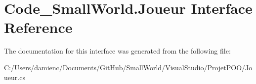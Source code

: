 \hypertarget{interface_code___small_world_1_1_joueur}{\section{Code\-\_\-\-Small\-World.\-Joueur Interface Reference}
\label{interface_code___small_world_1_1_joueur}
}


The documentation for this interface was generated from the following file\-:\begin{DoxyCompactItemize}
\item 
C\-:/\-Users/damienc/\-Documents/\-Git\-Hub/\-Small\-World/\-Visual\-Studio/\-Projet\-P\-O\-O/Joueur.\-cs\end{DoxyCompactItemize}
